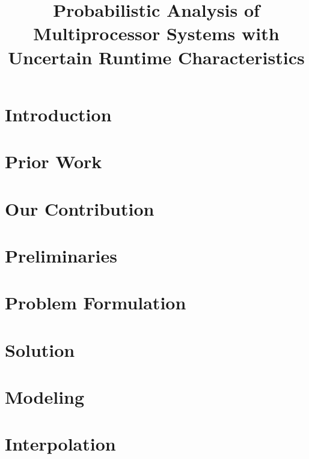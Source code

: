 \documentclass[journal]{IEEEtran}
\title{
  Probabilistic Analysis of Multiprocessor Systems
  with Uncertain Runtime Characteristics
}
\author{}
\begin{document}
  \maketitle

  \begin{abstract}
    
  \end{abstract}


  \section{Introduction}
  

  \section{Prior Work}
  

  \section{Our Contribution}
  

  \section{Preliminaries}
  

  \section{Problem Formulation} 
  

  \section{Solution} 
  

  \section{Modeling} 
  

  \section{Interpolation} 
  
\end{document}
